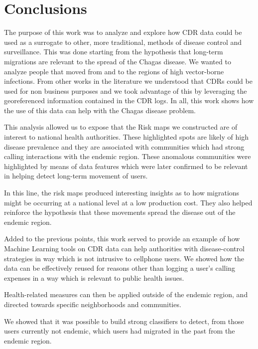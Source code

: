 \chapter{Conclusions}\label{ch:conclusions}

The purpose of this work was to analyze and explore how CDR data could be used as a surrogate to other, more traditional, methods of disease control and surveillance.
This was done starting from the hypothesis that long-term migrations are relevant to the spread of the Chagas disease.
We wanted to analyze people that moved from and to the regions of high vector-borne infections.
From other works in the literature we understood that CDRs could be used for non business purposes and we took advantage of this by leveraging the georeferenced information contained in the CDR logs.
In all, this work shows how the use of this data can help with the Chagas disease problem.


This analysis allowed us to expose that the Risk maps we constructed are of interest to national health authorities.
These highlighted spots are likely of high disease prevalence and they are associated with communities which had strong calling interactions with the endemic region.
These anomalous communities were highlighted by means of data features which were later confirmed to be relevant in helping detect long-term movement of users.


In this line, the risk maps produced interesting insights as to how migrations might be occurring at a national level at a low production cost.
They also helped reinforce the hypothesis that these movements spread the disease out of the endemic region.


Added to the previous points, this work served to provide an example of how Machine Learning tools on CDR data can help authorities with disease-control strategies in way which is not intrusive to cellphone users.
We showed how the data can be effectively reused for reasons other than logging a user's calling expenses in a way which is relevant to public health issues.

Health-related measures can then be applied outside of the endemic region, and directed towards specific neighborhoods and communities.
 
We showed that it was possible to build strong classifiers to detect, from those users currently not endemic, which users had migrated in the past from the endemic region.

